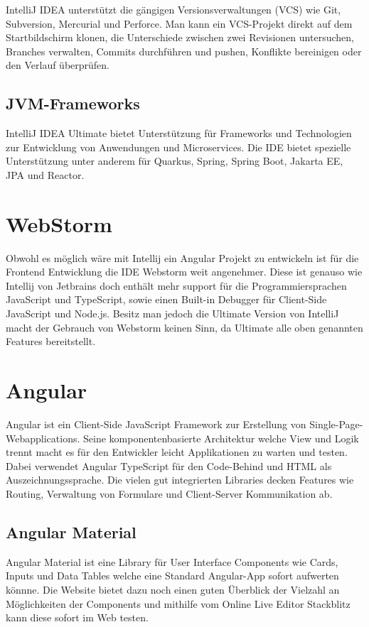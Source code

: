 IntelliJ IDEA unterstützt die gängigen Versionsverwaltungen (VCS) wie Git, Subversion, Mercurial und Perforce. 
Man kann ein VCS-Projekt direkt auf dem Startbildschirm klonen, die Unterschiede zwischen zwei Revisionen untersuchen, Branches verwalten, 
Commits durchführen und pushen, Konflikte bereinigen oder den Verlauf überprüfen. 
\cite{sysarch-intellij-1}


\subsection{JVM-Frameworks}

IntelliJ IDEA Ultimate bietet Unterstützung für Frameworks und Technologien zur Entwicklung von Anwendungen und Microservices. 
Die IDE bietet spezielle Unterstützung unter anderem für Quarkus, Spring, Spring Boot, Jakarta EE, JPA und Reactor.
\cite{sysarch-intellij-1}


\section{WebStorm}


Obwohl es möglich wäre mit Intellij ein Angular Projekt zu entwickeln ist für die Frontend Entwicklung 
die IDE Webstorm weit angenehmer. Diese ist genauso wie Intellij von Jetbrains doch enthält mehr support für die 
Programmiersprachen JavaScript und TypeScript, sowie einen Built-in Debugger für Client-Side JavaScript und Node.js.
Besitz man jedoch die Ultimate Version von IntelliJ macht der Gebrauch von Webstorm keinen Sinn, da Ultimate alle
oben genannten Features bereitstellt.
\cite{sysarch-webstorm-1}

\section{Angular}

Angular ist ein Client-Side JavaScript Framework zur Erstellung von Single-Page-Webapplications. 
Seine komponentenbasierte Architektur welche View und Logik trennt macht es für den Entwickler leicht 
Applikationen zu warten und testen. Dabei verwendet Angular TypeScript für den Code-Behind und HTML als Auszeichnungssprache. 
Die vielen gut integrierten Libraries decken Features wie Routing, Verwaltung von Formulare und Client-Server Kommunikation ab. 

\subsection{Angular Material}
Angular Material ist eine Library für User Interface Components wie Cards, Inputs und Data Tables welche eine Standard Angular-App sofort aufwerten könnne.
Die Website bietet dazu noch einen guten Überblick der Vielzahl an Möglichkeiten der Components und mithilfe vom Online Live Editor Stackblitz kann diese sofort im Web testen. 
\cite{sysarch-angularMaterial-1}

